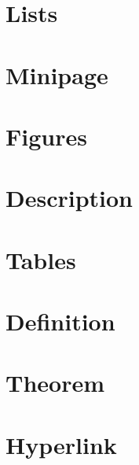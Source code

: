 
\section{Lists}
    

\section{Minipage}
    

\section{Figures}
    
    
\section{Description}
    
    
\section{Tables}
    
    
\section{Definition}
    
    
\section{Theorem}
    
    
\section{Hyperlink}
    